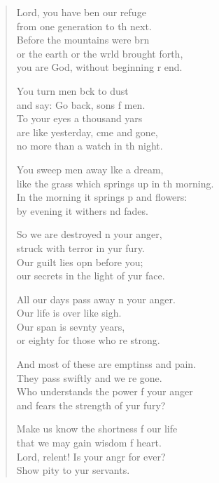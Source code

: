 \begin{verse}
  \begin{patverse}
 Lord, you have ben our refuge\Med\\
from one generation to th next.\\
Before the mountains were brn\Flex\\
or the earth or the wrld brought forth,\Med\\
you are God, without beginning r end.

You turn men bck to dust\Med\\
and say: Go back, sons f men.\\
To your eyes a thousand yars\Flex\\
are like yesterday, cme and gone,\Med\\
no more than a watch in th night.

You sweep men away l\pointup{\i}ke a dream,\Med\\
like the grass which springs up in th morning.\\
In the morning it springs p and flowers:\Med\\
by evening it withers nd fades.

So we are destroyed \pointup{\i}n your anger,\Med\\
struck with terror in yur fury.\\
Our guilt lies opn before you;\Med\\
our secrets in the light of yur face.

All our days pass away \pointup{\i}n your anger.\Med\\
Our life is over like  sigh.\\
Our span is sevnty years,\Med\\
or eighty for those who re strong.

And most of these are emptinss and pain.\Med\\
They pass swiftly and we re gone.\\
Who understands the power f your anger\Med\\
and fears the strength of yur fury?

Make us know the shortness f our life\Med\\
that we may gain wisdom f heart.\\
Lord, relent! Is your angr for ever?\Med\\
Show pity to yur servants.


\end{patverse}
\end{verse}
